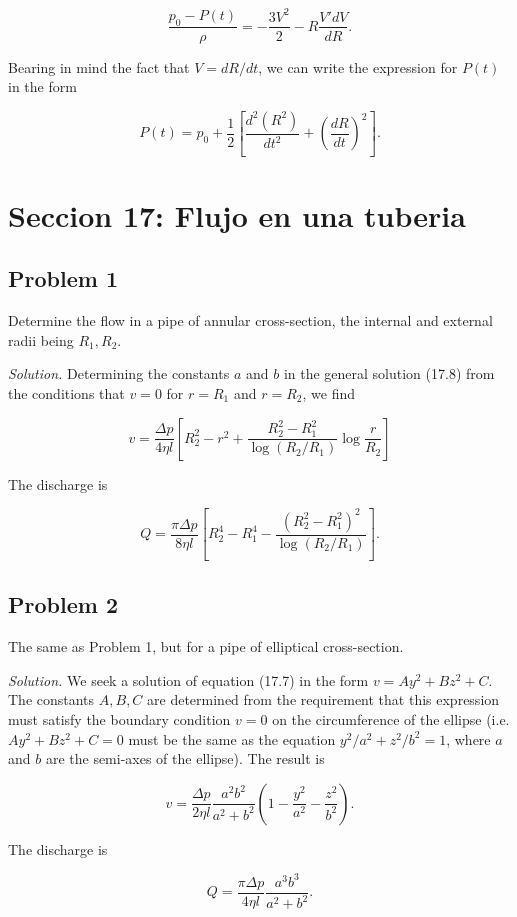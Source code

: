 \documentclass{article}
\begin{document}
$$
\frac{p_0 - P(t)}{\rho} = -\frac{3V^2}{2} - R \frac{V' dV}{dR}.
$$

Bearing in mind the fact that $V = dR/dt$, we can write the expression for $P(t)$ in the form

$$
P(t) = p_0 + \frac{1}{2} \left[ \frac{d^2(R^2)}{dt^2} + \left( \frac{dR}{dt} \right)^2 \right].
$$

\section*{Seccion 17: Flujo en una tuberia}

\subsection*{Problem 1}

Determine the flow in a pipe of annular cross-section, the internal and external radii being $R_1, R_2$.

\textit{Solution.} Determining the constants $a$ and $b$ in the general solution (17.8) from the conditions that $v = 0$ for $r = R_1$ and $r = R_2$, we find

$$
v = \frac{\Delta p}{4\eta l} \left[ R_2^2 - r^2 + \frac{R_2^2 - R_1^2}{\log(R_2/R_1)} \log \frac{r}{R_2} \right]
$$

The discharge is

$$
Q = \frac{\pi \Delta p}{8\eta l} \left[ R_2^4 - R_1^4 - \frac{(R_2^2 - R_1^2)^2}{\log(R_2/R_1)} \right].
$$

\subsection*{Problem 2}

The same as Problem 1, but for a pipe of elliptical cross-section.

\textit{Solution.} We seek a solution of equation (17.7) in the form $v = Ay^2 + Bz^2 + C$. The constants $A, B, C$ are determined from the requirement that this expression must satisfy the boundary condition $v = 0$ on the circumference of the ellipse (i.e. $Ay^2 + Bz^2 + C = 0$ must be the same as the equation $y^2/a^2 + z^2/b^2 = 1$, where $a$ and $b$ are the semi-axes of the ellipse). The result is

$$
v = \frac{\Delta p}{2\eta l} \frac{a^2 b^2}{a^2 + b^2} \left( 1 - \frac{y^2}{a^2} - \frac{z^2}{b^2} \right).
$$

The discharge is

$$
Q = \frac{\pi \Delta p}{4\eta l} \frac{a^3 b^3}{a^2 + b^2}.
$$
\end{document}
